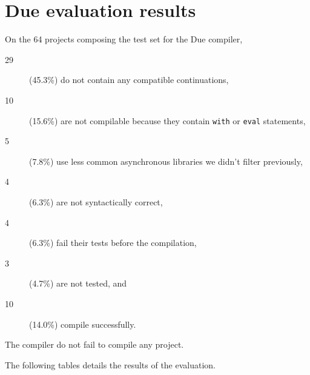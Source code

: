 \section{Due evaluation results}
\eject

On the 64 projects composing the test set for the Due compiler, 
\begin{description}
\item[29] (45.3\%) do not contain any compatible continuations,
\item[10] (15.6\%) are not compilable because they contain \texttt{with} or \texttt{eval} statements,
\item[5] (7.8\%) use less common asynchronous libraries we didn't filter previously,
\item[4] (6.3\%) are not syntactically correct,
\item[4] (6.3\%) fail their tests before the compilation,
\item[3] (4.7\%) are not tested, and
\item[10] (14.0\%) compile successfully.
\end{description}
The compiler do not fail to compile any project.


The following tables details the results of the evaluation.


